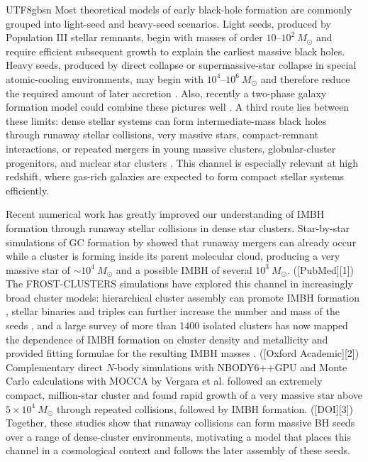 \documentclass[trackchanges, twocolappendix, twocolumn]{aastex701}
\begin{document}
\begin{CJK*}{UTF8}{gbsn}
Most theoretical models of early black-hole formation are commonly grouped into light-seed and heavy-seed scenarios. Light seeds, produced by Population III stellar remnants, begin with masses of order $10$--$10^2~M_\odot$ and require efficient subsequent growth to explain the earliest massive black holes. Heavy seeds, produced by direct collapse or supermassive-star collapse in special atomic-cooling environments, may begin with $10^4$--$10^6~M_\odot$ and therefore reduce the required amount of later accretion \citep{BrommLoeb2003, Begelman+2006, LodatoNatarajan2006, LatifFerrara2016}. Also, recently a two-phase galaxy formation model could combine these pictures well \citep{Mo+2024TwoGFM, Chen+2024TwoGFM, Chen+2025aTwoGFM, Chen+2025bTwoGFM}. A third route lies between these limits: dense stellar systems can form intermediate-mass black holes through runaway stellar collisions, very massive stars, compact-remnant interactions, or repeated mergers in young massive clusters, globular-cluster progenitors, and nuclear star clusters \citep{PortegiesZwartMcMillan2002, DevecchiVolonteri2009, Davies+2011, Rantala+2026}. This channel is especially relevant at high redshift, where gas-rich galaxies are expected to form compact stellar systems efficiently.

Recent numerical work has greatly improved our understanding of IMBH formation through runaway stellar collisions in dense star clusters. Star-by-star simulations of GC formation by \citet{Fujii+2024bASURA+BRIDGE} showed that runaway mergers can already occur while a cluster is forming inside its parent molecular cloud, producing a very massive star of $\sim10^4~M_\odot$ and a possible IMBH of several $10^3~M_\odot$. ([PubMed][1]) The FROST-CLUSTERS simulations have explored this channel in increasingly broad cluster models: hierarchical cluster assembly can promote IMBH formation \citep{Rantala+2024FROST}, stellar binaries and triples can further increase the number and mass of the seeds \citep{Rantala+2025FROST}, and a large survey of more than 1400 isolated clusters has now mapped the dependence of IMBH formation on cluster density and metallicity and provided fitting formulae for the resulting IMBH masses \citep{Rantala+2026FROST}. ([Oxford Academic][2]) Complementary direct $N$-body simulations with \textsc{NBODY6++GPU} and Monte Carlo calculations with \textsc{MOCCA} by Vergara et al. followed an extremely compact, million-star cluster and found rapid growth of a very massive star above $5\times10^4~M_\odot$ through repeated collisions, followed by IMBH formation. ([DOI][3]) Together, these studies show that runaway collisions can form massive BH seeds over a range of dense-cluster environments, motivating a model that places this channel in a cosmological context and follows the later assembly of these seeds.


\end{CJK*}
\end{document}
